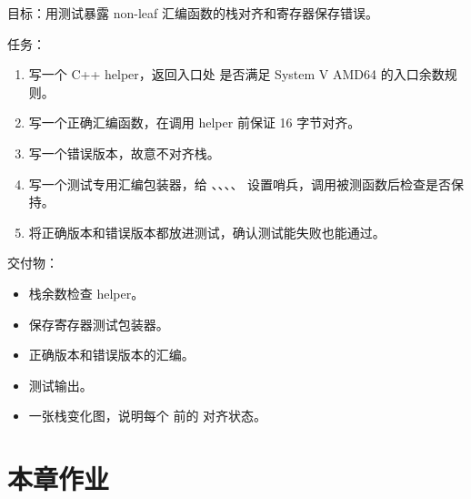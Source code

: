 \begin{labbox}
目标：用测试暴露 non-leaf 汇编函数的栈对齐和寄存器保存错误。

任务：

\begin{enumerate}
  \item 写一个 C++ helper，返回入口处  是否满足 System V AMD64 的入口余数规则。
  \item 写一个正确汇编函数，在调用 helper 前保证  16 字节对齐。
  \item 写一个错误版本，故意不对齐栈。
  \item 写一个测试专用汇编包装器，给 、、、、 设置哨兵，调用被测函数后检查是否保持。
  \item 将正确版本和错误版本都放进测试，确认测试能失败也能通过。
\end{enumerate}

交付物：

\begin{itemize}
  \item 栈余数检查 helper。
  \item 保存寄存器测试包装器。
  \item 正确版本和错误版本的汇编。
  \item 测试输出。
  \item 一张栈变化图，说明每个  前的  对齐状态。
\end{itemize}
\end{labbox}

\section{本章作业}

